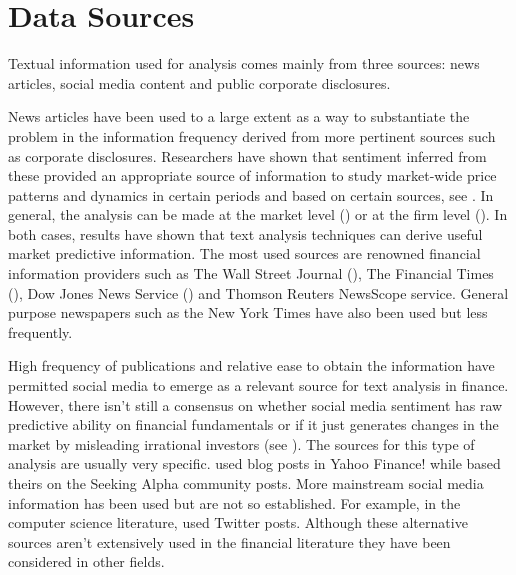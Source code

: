 \documentclass[a4paper, 12pt]{report}
\begin{document}
    \section{Data Sources}
    
    Textual information used for analysis comes mainly from three sources: news articles, social media content and public corporate disclosures. 
    
    
    News articles have been used to a large extent as a way to substantiate the problem in the information frequency derived from more pertinent sources such as corporate disclosures. Researchers have shown that sentiment inferred from these provided an appropriate source of information to study market-wide price patterns and dynamics in certain periods and based on certain sources, see \textcite{Kearney:2014}. In general, the analysis can be made at the market level (\textcite{Tetlock:2007}) or at the firm level (\textcite{Tetlock:2008}). In both cases, results have shown that text analysis techniques can derive useful market predictive information. The most used sources are renowned financial information providers such as The Wall Street Journal (\textcite{Bybee:2020}), The Financial Times (\textcite{Wuthrich:1998}), Dow Jones News Service (\textcite{Ke:2019}) and Thomson Reuters NewsScope service. General purpose newspapers such as the New York Times have also been used but less frequently.  
    
    High frequency of publications and relative ease to obtain the information have permitted social media to emerge as a relevant source for text analysis in finance. However, there isn't still a consensus on whether social media sentiment has raw predictive ability on financial fundamentals or if it just generates changes in the market by misleading irrational investors (see \textcite{Chen:2014}). The sources for this type of analysis are usually very specific. \textcite{Antweiler:2004} used blog posts in Yahoo Finance! while \textcite{Chen:2014} based theirs on the Seeking Alpha community posts. More mainstream social media information has been used but are not so established. For example, in the computer science literature, \textcite{Bollen:2011} used Twitter posts. Although these alternative sources aren't extensively used in the financial literature they have been considered in other fields. 
    
\end{document}
